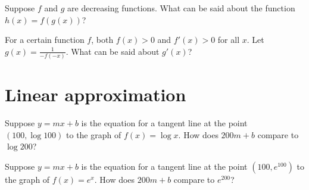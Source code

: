 \documentclass{ximera}
\begin{document}
\begin{problem}
  Suppose $f$ and $g$ are decreasing functions.  What can be said about the function $h(x) = f(g(x))$?
  \begin{multipleChoice}
  \end{multipleChoice}
\end{problem}

\begin{problem}
  For a certain function $f$, both $f(x) > 0$ and $f'(x) > 0$ for all $x$.  Let $g(x) = \frac{1}{-f(-x)}$.  What can be said about $g'(x)$?
  \begin{multipleChoice}
  \end{multipleChoice}
\end{problem}

\clearpage

\section{Linear approximation}

\begin{problem}
  Suppose $y = mx + b$ is the equation for a tangent line at the point $(100,\log 100)$ to the graph of $f(x) = \log x$.  How does $200m + b$ compare to $\log 200$?
  \begin{multipleChoice}
  \end{multipleChoice}
\end{problem}

\begin{problem}
  Suppose $y = mx + b$ is the equation for a tangent line at the point $(100,e^{100})$ to the graph of $f(x) = e^x$.  How does $200m + b$ compare to $e^{200}$?
  \begin{multipleChoice}
  \end{multipleChoice}
\end{problem}
\end{document}
